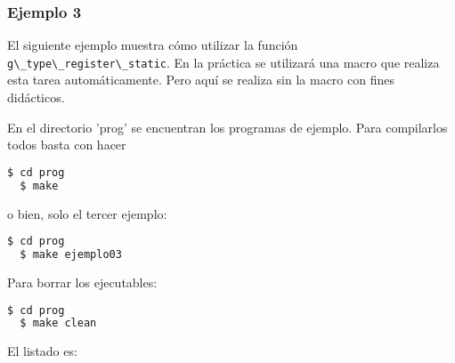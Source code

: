\subsubsection{Ejemplo 3}
El siguiente ejemplo muestra cómo utilizar la función \passthrough{\lstinline!g\_type\_register\_static!}.
En la práctica se utilizará una macro que realiza esta tarea automáticamente. Pero aquí se realiza sin
la macro con fines didácticos.

En el directorio 'prog' se encuentran los programas de ejemplo.
Para compilarlos todos basta con hacer
\begin{lstlisting}[language=bash]
  $ cd prog
  $ make
\end{lstlisting}
o bien, solo el tercer ejemplo:
\begin{lstlisting}[language=bash]
  $ cd prog
  $ make ejemplo03
\end{lstlisting}
Para borrar los ejecutables:
\begin{lstlisting}[language=bash]
  $ cd prog
  $ make clean
\end{lstlisting}


El listado es:

